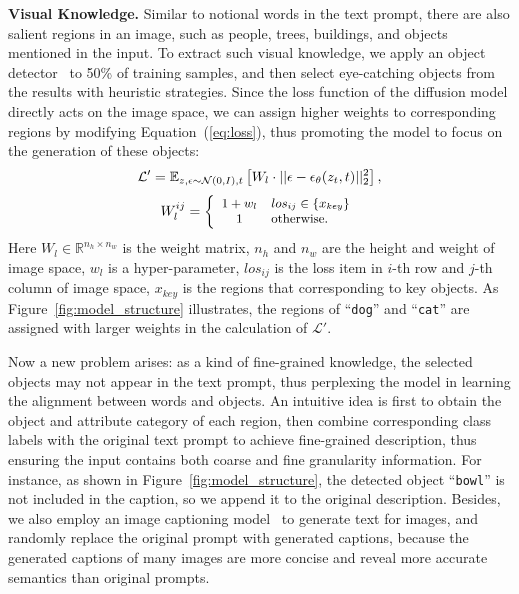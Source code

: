 \documentclass[10pt,twocolumn,letterpaper]{article}
\begin{document}
\noindent\textbf{Visual Knowledge.}
Similar to notional words in the text prompt, there are also salient regions in an image, such as people, trees, buildings, and objects mentioned in the input. 
To extract such visual knowledge, we apply an object detector~\cite{DBLP:conf/cvpr/00010BT0GZ18} to 50\% of training samples, and then select eye-catching objects from the results with heuristic strategies.
Since the loss function of the diffusion model directly acts on the image space, we can assign higher weights to corresponding regions by modifying Equation~(\ref{eq:loss}), thus promoting the model to focus on the generation of these objects:
\begin{equation}
\small
    \mathcal{L}' = \mathbb{E}_{z, \epsilon \sim \mathcal{N}(0,I), t} 
    \left[W_l \cdot || \epsilon - \epsilon_\theta(z_t, t) ||_2^2 \right],
\end{equation}
\begin{equation}
\small
    W_l^{ij} = \left\{ \begin{array}{cl} 1+w_l & {los_{ij} \in \{x_{key}\} } \\ 1 & {\rm otherwise.}    
    \end{array}\right.
\end{equation}
Here $W_l \in \mathbb{R}^{n_{h} \times n_{w}}$ is the weight matrix, $n_h$ and $n_w$ are the height and weight of image space, $w_l$ is a hyper-parameter, $los_{ij}$ is the loss item in $i$-th row and $j$-th column of image space, $x_{key}$ is the regions that corresponding to key objects. 
As Figure~\ref{fig:model_structure} illustrates, the regions of ``\verb|dog|'' and ``\verb|cat|'' are assigned with larger weights in the calculation of $\mathcal{L}'$.

Now a new problem arises: as a kind of fine-grained knowledge, the selected objects may not appear in the text prompt, thus perplexing the model in learning the alignment between words and objects.
An intuitive idea is first to obtain the object and attribute category of each region, then combine corresponding class labels with the original text prompt to achieve fine-grained description, thus ensuring the input contains both coarse and fine granularity information.
For instance, as shown in Figure~\ref{fig:model_structure}, the detected object ``\verb|bowl|'' is not included in the caption, so we append it to the original description.
Besides, we also employ an image captioning model~\cite{DBLP:conf/icml/WangYMLBLMZZY22} to generate text for images, and randomly replace the original prompt with generated captions, because the generated captions of many images are more concise and reveal more accurate semantics than original prompts.
\end{document}
